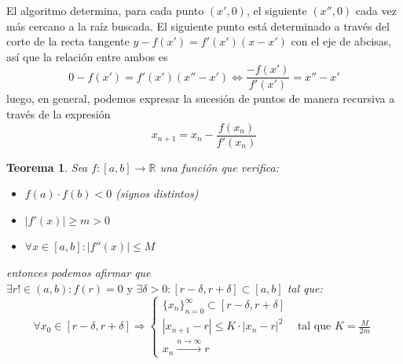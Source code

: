 \documentclass[10pt,a4paper,openright]{book}
\theoremstyle{break}
\newtheorem{theo}{Teorema}[chapter]
\begin{document}
El algoritmo determina, para cada punto $(x', 0)$, el siguiente $(x'', 0)$ cada vez más cercano a la raíz buscada. El siguiente punto está determinado a través del corte de la recta tangente $y-f(x')=f'(x')(x-x')$ con el eje de abcisas, así que la relación entre ambos es
\[
0-f(x')=f'(x')(x''-x')\Leftrightarrow \frac{-f(x')}{f'(x')}=x''-x'
\]
luego, en general, podemos expresar la sucesión de puntos de manera recursiva a través de la expresión
$$x_{n+1}=x_n-\frac{f(x_n)}{f'(x_n)}$$

\begin{theo}
Sea $f: [a,b]\rightarrow \mathbb R$ una función que verifica:
\begin{itemize}
\item $f(a)\cdot f(b)<0$ (signos distintos)
\item $|f'(x)|\geq m>0$
\item $\forall x\in [a,b]: |f''(x)|\leq M$
\end{itemize}
entonces podemos afirmar que $\exists r!\in (a,b):f(r)=0\mbox{ y } \exists \delta > 0 : [r-\delta, r+\delta]\subset [a,b]$ tal que:
$$\forall x_0\in [r-\delta, r+\delta]\Rightarrow \begin{cases}\{x_n\}_{n=0}^\infty \subset [r-\delta, r+\delta] \\ |x_{n+1}-r|\leq K\cdot |x_n-r|^2 &\mbox{ tal que } K=\frac{M}{2m} \\ x_n\xrightarrow{n\rightarrow \infty}r \end{cases}$$
\end{theo}
\end{document}
